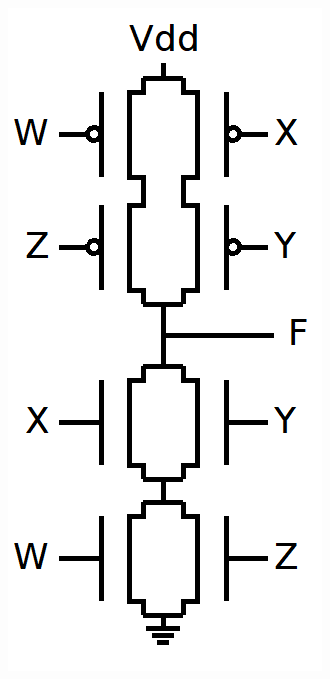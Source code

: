 \documentclass[12pt,letterpaper,titlepage]{article}
\begin{document}
\begin{raggedright}
\begin{paracol}{2}
\begin{center}
\includegraphics[width=\textwidth, height=17\baselineskip, keepaspectratio=true]{hw1q6a}
\end{center}


\end{paracol}
\end{raggedright}
\end{document}
